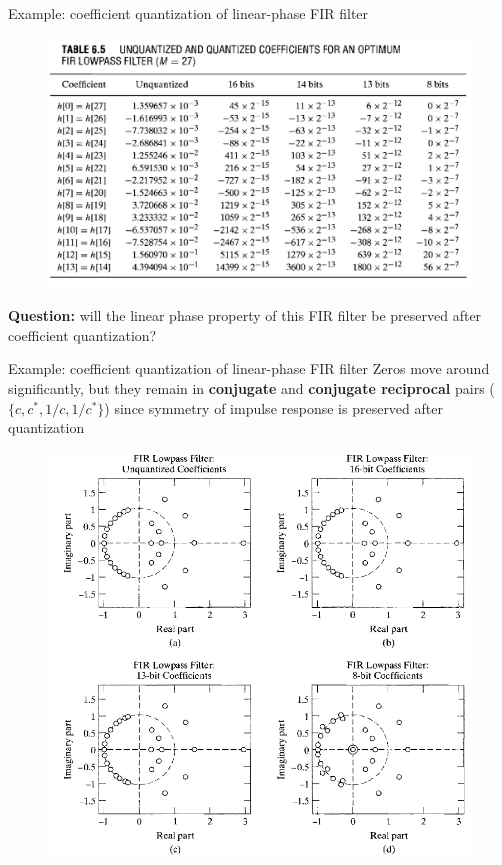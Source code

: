 \documentclass[10pt]{beamer}
\begin{document}
%
\begin{frame}{Example: coefficient quantization of linear-phase FIR filter}
	\begin{figure}
		\centering
		\includegraphics[scale=0.35]{figs/fir_quantized_coefficients.png}
	\end{figure}
	\pause
	\textbf{Question:} will the linear phase property of this FIR filter be preserved after coefficient quantization?
\end{frame}


\begin{frame}{Example: coefficient quantization of linear-phase FIR filter}
	Zeros move around significantly, but they remain in \textbf{conjugate} and \textbf{conjugate reciprocal}  pairs ($\{c, c^*, 1/c, 1/c^*\}$) since symmetry of impulse response is preserved after quantization
	\begin{figure}
		\centering
		\includegraphics[scale=0.33]{figs/pole_zero_fir_quantized.png}
	\end{figure}
\end{frame}
\end{document}
